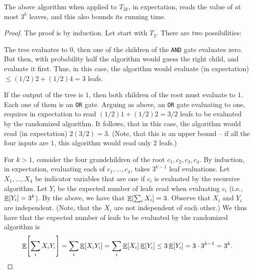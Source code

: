 \begin{lemma}
    The above algorithm when applied to $T_{2k}$, in expectation,
    reads the value of at most $3^k$ leaves, and this also bounds its
    running time.
\end{lemma}
\begin{proof}
    The proof is by induction. Let start with $T_2$.  There are two
    possibilities:
    \begin{compactenumi}
        \smallskip%
        \item The tree evaluates to $0$, then one of the children of
        the \texttt{AND} gate evaluates zero. But then, with
        probability half the algorithm would guess the right child,
        and evaluate it first. Thus, in this case, the algorithm would
        evaluate (in expectation) $\leq(1/2)2 + (1/2)4 = 3$ leafs.

        \smallskip%
        \item If the output of the tree is $1$, then both children of
        the root must evaluate to $1$. Each one of them is an
        \texttt{OR} gate. Arguing as above, an \texttt{OR} gate
        evaluating to one, requires in expectation to read
        $(1/2)1 + (1/2)2 = 3/2$ leafs to be evaluated by the
        randomized algorithm. It follows, that in this case, the
        algorithm would read (in expectation) $2(3/2) = 3$.  (Note,
        that this is an upper bound -- if all the four inputs are $1$,
        this algorithm would read only $2$ leafs.)
    \end{compactenumi}

    \bigskip%
    
    For $k>1$, consider the four grandchildren of the root
    $c_1, c_2, c_3, c_4$.
    By induction, in expectation, evaluating
    each of $c_1, \ldots, c_4$, takes $3^{k-1}$ leaf evaluations. Let
    $X_1, \ldots, X_4$ be indicator variables that are one if $c_i$ is
    evaluated by the recursive algorithm. Let $Y_i$ be the expected
    number of leafs read when evaluating $c_i$ (i.e.,
    $\mathop{\mathbb{E}}\!\left[ {Y_i} \right] = 3^{k}$). By the above, we have that
    $\mathop{\mathbb{E}}\!\left[ {\sum_{i} X_i} \right] =3$. Observe that $X_i$ and $Y_i$ are
    independent. (Note, that the $X_i$ are not independent of each
    other.) 
    We thus have that the expected number of leafs to be
    evaluated by the randomized algorithm is 
    \begin{equation*}
        \Ex{\sum_{i} X_iY_i}%
        =%
        \sum_{i}\Ex{ X_iY_i}%
        =%
        \sum_{i}\Ex{ X_i}\Ex{Y_i}%
        \leq%
        3 \Ex{Y_i}%
        =%
        3\cdot 3^{k-1}%
        =%
        3^k.
    \end{equation*}
\end{proof}

